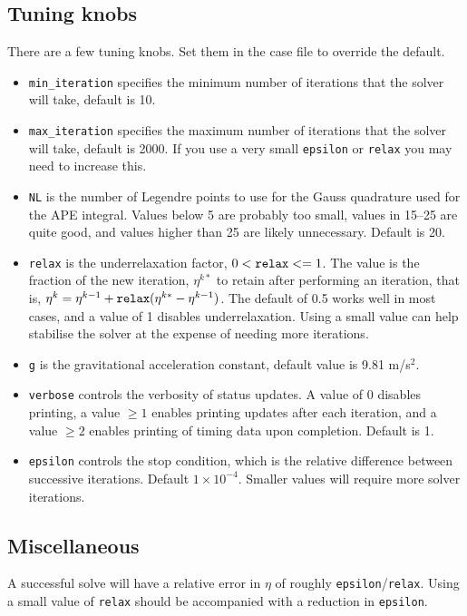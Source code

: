 \documentclass[letterpaper]{article}
\begin{document}
\subsection{Tuning knobs}
There are a few tuning knobs. Set them in the case file to override the default.
\begin{itemize}
 \item \verb+min_iteration+ specifies the minimum number of iterations that the solver will take, default is 10.
 \item \verb+max_iteration+ specifies the maximum number of iterations that the solver will take, default is 2000. If you use a very small \verb+epsilon+ or \verb+relax+ you may need to increase this.
 \item \verb+NL+ is the number of Legendre points to use for the Gauss quadrature used for the APE integral. Values below 5 are probably too small, values in 15--25 are quite good, and values higher than 25 are likely unnecessary. Default is 20.
 \item \verb+relax+ is the underrelaxation factor, $0 < \verb+relax+ <= 1$.
        The value is the fraction of the new iteration, $\eta^{k*}$ to retain
        after performing an iteration, that is,
        $\eta^k = \eta^{k-1} + \verb+relax+(\eta^{k*} - \eta^{k-1})$.
        The default of 0.5 works well in most cases, and a value of 1 disables underrelaxation.
        Using a small value can help stabilise the solver at the expense of needing more iterations.
 \item \verb+g+ is the gravitational acceleration constant, default value is 9.81 m/s$^2$.
 \item \verb+verbose+ controls the verbosity of status updates. A value of 0 disables printing, a value $\ge 1$ enables printing updates after each iteration, and a value $\ge 2$ enables printing of timing data upon completion. Default is 1.
\item \verb+epsilon+ controls the stop condition, which is the relative difference between successive iterations. Default $1\times10^{-4}$. Smaller values will require more solver iterations.
\end{itemize}

\subsection{Miscellaneous}

A successful solve will have a relative error in $\eta$ of roughly \verb+epsilon+/\verb+relax+. Using a small value of \verb+relax+ should be accompanied with a reduction in \verb+epsilon+.
\end{document}

